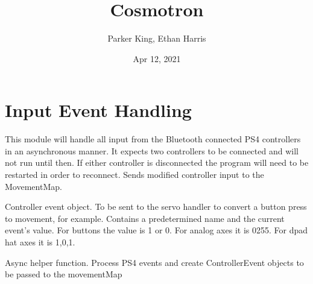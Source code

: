 \documentclass[letterpaper,10pt,english]{sphinxmanual}
\title{Cosmotron}
\date{Apr 12, 2021}
\author{Parker King, Ethan Harris}
\begin{document}
\pagestyle{empty}
\sphinxmaketitle
\pagestyle{plain}
\sphinxtableofcontents
\pagestyle{normal}
\label{\detokenize{index::doc}}



\chapter{Input Event Handling}
\label{\detokenize{input:module-manualControl}}\label{\detokenize{input:input-event-handling}}\label{\detokenize{input::doc}}
\sphinxAtStartPar
This module will handle all input from the Bluetooth connected PS4 controllers in an asynchronous manner. It expects two controllers to be connected 
and will not run until then. If either controller is disconnected the program will need to be restarted in order to reconnect.
Sends modified controller input to the MovementMap.

\begin{fulllineitems}
\label{\detokenize{input:manualControl.ControllerEvent}}
\sphinxAtStartPar
Controller event object. To be sent to the servo handler to convert a button press to movement, for example. 
Contains a predetermined name and the current event’s value. 
For buttons the value is 1 or 0. For analog axes it is 0\sphinxhyphen{}255. For d\sphinxhyphen{}pad hat axes it is \sphinxhyphen{}1,0,1.

\end{fulllineitems}


\begin{fulllineitems}
\label{\detokenize{input:manualControl.process_events}}
\sphinxAtStartPar
Async helper function. Process PS4 events and create ControllerEvent objects to be passed to the movementMap

\end{fulllineitems}
\end{document}
